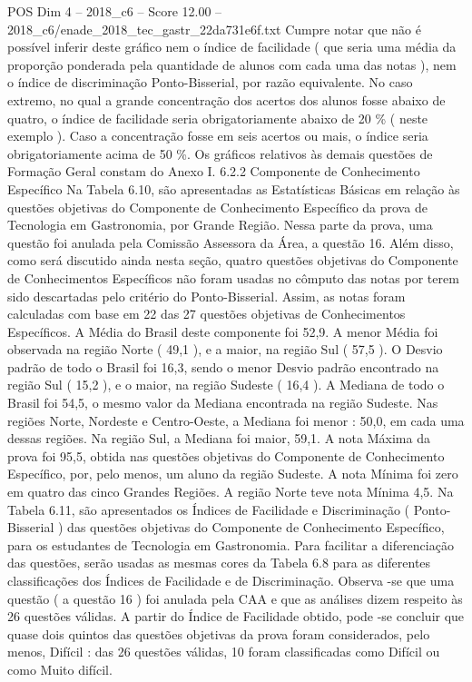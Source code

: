 \begin{textsample}{POS Dim 4 – 2018\_c6 – Score 12.00 – 2018\_c6/enade\_2018\_tec\_gastr\_22da731e6f.txt}
Cumpre notar que não é possível inferir deste gráfico nem o índice de facilidade ( que seria uma média da proporção ponderada pela quantidade de alunos com cada uma das notas ), nem o índice de discriminação Ponto-Bisserial, por razão equivalente.
No caso extremo, no qual a grande concentração dos acertos dos alunos fosse abaixo de quatro, o índice de facilidade seria obrigatoriamente abaixo de 20 \% ( neste exemplo ).
Caso a concentração fosse em seis acertos ou mais, o índice seria obrigatoriamente acima de 50 \%.
Os gráficos relativos às demais questões de Formação Geral constam do Anexo I. 6.2.2 Componente de Conhecimento Específico Na Tabela 6.10, são apresentadas as Estatísticas Básicas em relação às questões objetivas do Componente de Conhecimento Específico da prova de Tecnologia em Gastronomia, por Grande Região.
Nessa parte da prova, uma questão foi anulada pela Comissão Assessora da Área, a questão 16.
Além disso, como será discutido ainda nesta seção, quatro questões objetivas do Componente de Conhecimentos Específicos não foram usadas no cômputo das notas por terem sido descartadas pelo critério do Ponto-Bisserial.
Assim, as notas foram calculadas com base em 22 das 27 questões objetivas de Conhecimentos Específicos.
A Média do Brasil deste componente foi 52,9.
A menor Média foi observada na região Norte ( 49,1 ), e a maior, na região Sul ( 57,5 ).
O Desvio padrão de todo o Brasil foi 16,3, sendo o menor Desvio padrão encontrado na região Sul ( 15,2 ), e o maior, na região Sudeste ( 16,4 ).
A Mediana de todo o Brasil foi 54,5, o mesmo valor da Mediana encontrada na região Sudeste.
Nas regiões Norte, Nordeste e Centro-Oeste, a Mediana foi menor : 50,0, em cada uma dessas regiões.
Na região Sul, a Mediana foi maior, 59,1.
A nota Máxima da prova foi 95,5, obtida nas questões objetivas do Componente de Conhecimento Específico, por, pelo menos, um aluno da região Sudeste.
A nota Mínima foi zero em quatro das cinco Grandes Regiões.
A região Norte teve nota Mínima 4,5.
Na Tabela 6.11, são apresentados os Índices de Facilidade e Discriminação ( Ponto-Bisserial ) das questões objetivas do Componente de Conhecimento Específico, para os estudantes de Tecnologia em Gastronomia.
Para facilitar a diferenciação das questões, serão usadas as mesmas cores da Tabela 6.8 para as diferentes classificações dos Índices de Facilidade e de Discriminação.
Observa -se que uma questão ( a questão 16 ) foi anulada pela CAA e que as análises dizem respeito às 26 questões válidas.
A partir do Índice de Facilidade obtido, pode -se concluir que quase dois quintos das questões objetivas da prova foram considerados, pelo menos, Difícil : das 26 questões válidas, 10 foram classificadas como Difícil ou como Muito difícil.

\end{textsample}
